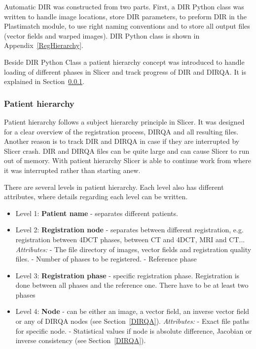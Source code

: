 \documentclass[type=dr, dr=rernat, accentcolor=tud7b,colorbacktitle, bigchapter, openright, twoside, 12pt ]{tudthesis}
\begin{document}
Automatic DIR was constructed from two parts. First, a DIR Python class was written to handle image locations, store DIR parameters, to preform DIR in the Plastimatch module, to use right naming conventions and to store all output files (vector fields and warped images). 
DIR Python class is shown in Appendix~\ref{RegHierarchy}.

Beside DIR Python Class a patient hierarchy concept was introduced to handle loading of different phases in Slicer and track progress of DIR and DIRQA. It is explained in Section~\ref{PatHierarchy}.


\subsubsection{Patient hierarchy} 
\label{PatHierarchy}

Patient hierarchy follows a subject hierarchy principle in Slicer. It was designed for a clear overview of the registration process, DIRQA and all resulting files. Another reason is to track DIR
and DIRQA in case if they are interrupted by Slicer crash. DIR and DIRQA files can be quite large and can cause Slicer to run out of memory. With patient hierarchy Slicer is able to continue work
from where it was interrupted rather than starting anew.

There are several levels in patient hierarchy. Each level also has different attributes, where details regarding each level can be written.

\begin{itemize}
	\item Level 1: \textbf{Patient name} - separates different patients.
	\item Level 2: \textbf{Registration node} - separates between different registration, e.g. registration between 4DCT phases, between CT and 4DCT, MRI and CT... 
	\subitem \textit{Attributes:}
	\subitem - The file directory of images, vector fields and registration quality files.
	\subitem - Number of phases to be registered.
	\subitem - Reference phase
	\item Level 3: \textbf{Registration phase} - specific registration phase. Registration is done between all phases and the reference one. There have to be at least two phases
	\item Level 4: \textbf{Node} - can be either an image, a vector field, an inverse vector field or any of DIRQA nodes (see Section~\ref{DIRQA}).
	\subitem \textit{Attributes:}
	\subitem - Exact file paths for specific node.
	\subitem - Statistical values if node is absolute difference, Jacobian or inverse consistency (see Section~\ref{DIRQA}).
\end{itemize}
\end{document}
